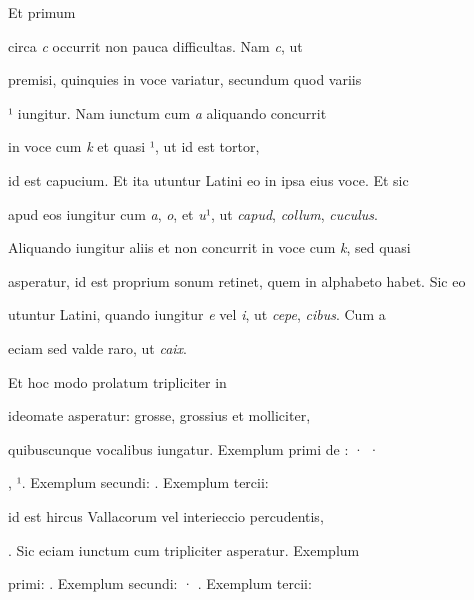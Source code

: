 \indentK Et primum

\fulllines

circa \textit{c} occurrit non pauca difficultas. Nam \textit{c}, ut 

premisi, quinquies in voce variatur, secundum quod variis 

¹ iungitur. Nam iunctum cum \textit{a} aliquando concurrit 

in voce cum \textit{k} et quasi ¹, ut  id est tortor,  


id est capucium. Et ita utuntur Latini eo in ipsa eius voce. Et sic 

apud eos iungitur cum \textit{a}, \textit{o}, et \textit{u}¹, ut \textit{capud}, \textit{collum}, \textit{cuculus}. 

Aliquando iungitur aliis et non concurrit in voce cum \textit{k}, sed quasi 

asperatur, id est proprium sonum retinet, quem in alphabeto habet. Sic eo 

utuntur Latini, quando iungitur \textit{e} vel \textit{i}, ut \textit{cepe}, \textit{cibus}. Cum a 

\splitlines
eciam sed valde raro, ut \textit{caix}.

\indentK Et hoc modo prolatum tripliciter in 

\fulllines

 ideomate asperatur: grosse, grossius et molliciter, 

quibuscunque vocalibus iungatur. Exemplum primi de : · · 

, ¹. Exemplum secundi:   . Exemplum tercii: 

  id est hircus Vallacorum vel interieccio percudentis, 

 . Sic eciam iunctum cum  tripliciter asperatur. Exemplum 

primi:  . Exemplum secundi: · . Exemplum tercii: 

